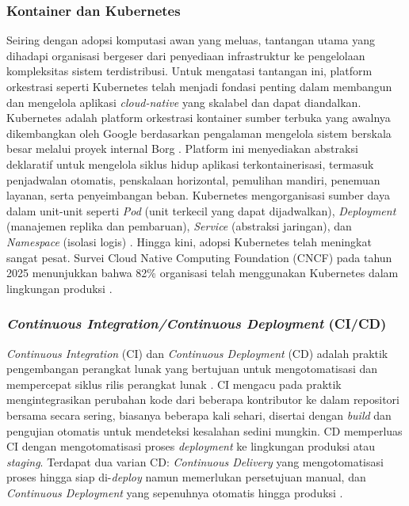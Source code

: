 \subsubsection{Kontainer dan Kubernetes}

Seiring dengan adopsi komputasi awan yang meluas, tantangan utama yang dihadapi organisasi bergeser dari penyediaan infrastruktur ke pengelolaan kompleksitas sistem terdistribusi. Untuk mengatasi tantangan ini, platform orkestrasi seperti Kubernetes telah menjadi fondasi penting dalam membangun dan mengelola aplikasi \textit{cloud-native} yang skalabel dan dapat diandalkan. Kubernetes adalah platform orkestrasi kontainer sumber terbuka yang awalnya dikembangkan oleh Google berdasarkan pengalaman mengelola sistem berskala besar melalui proyek internal Borg \citep{Burns_2016_Borg}. Platform ini menyediakan abstraksi deklaratif untuk mengelola siklus hidup aplikasi terkontainerisasi, termasuk penjadwalan otomatis, penskalaan horizontal, pemulihan mandiri, penemuan layanan, serta penyeimbangan beban. Kubernetes mengorganisasi sumber daya dalam unit-unit seperti \textit{Pod} (unit terkecil yang dapat dijadwalkan), \textit{Deployment} (manajemen replika dan pembaruan), \textit{Service} (abstraksi jaringan), dan \textit{Namespace} (isolasi logis) \citep{Burns_2019_Kubernetes}. Hingga kini, adopsi Kubernetes telah meningkat sangat pesat. Survei Cloud Native Computing Foundation (CNCF) pada tahun 2025 menunjukkan bahwa 82\% organisasi telah menggunakan Kubernetes dalam lingkungan produksi \citep{CNCF_2026_Kubernetes}.

\subsubsection{\textit{Continuous Integration/Continuous Deployment} (CI/CD)}

\textit{Continuous Integration} (CI) dan \textit{Continuous Deployment} (CD) adalah praktik pengembangan perangkat lunak yang bertujuan untuk mengotomatisasi dan mempercepat siklus rilis perangkat lunak \citep{Shahin_2017_CICD}. CI mengacu pada praktik mengintegrasikan perubahan kode dari beberapa kontributor ke dalam repositori bersama secara sering, biasanya beberapa kali sehari, disertai dengan \textit{build} dan pengujian otomatis untuk mendeteksi kesalahan sedini mungkin. CD memperluas CI dengan mengotomatisasi proses \textit{deployment} ke lingkungan produksi atau \textit{staging}. Terdapat dua varian CD: \textit{Continuous Delivery} yang mengotomatisasi proses hingga siap di-\textit{deploy} namun memerlukan persetujuan manual, dan \textit{Continuous Deployment} yang sepenuhnya otomatis hingga produksi \citep{HumbleFarley_2010_CD}.

